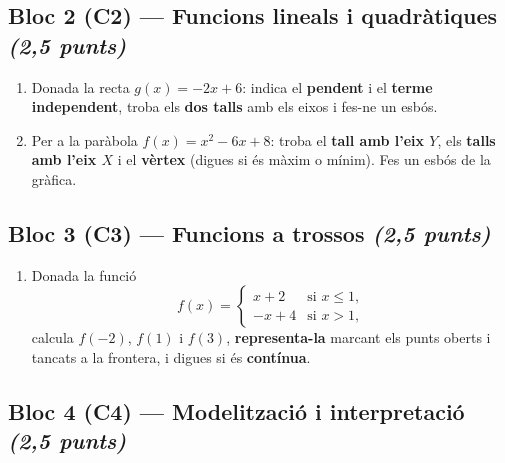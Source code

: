 \subsection*{Bloc 2 (C2) — Funcions lineals i quadràtiques \hfill \normalfont\itshape (2,5 punts)}

\begin{enumerate}[label=\textbf{\arabic*.}, leftmargin=2em, itemsep=8pt, start=3]
  \item Donada la recta $g(x)=-2x+6$: indica el \textbf{pendent} i el \textbf{terme
        independent}, troba els \textbf{dos talls} amb els eixos i fes-ne un esbós.
  \item Per a la paràbola $f(x)=x^2-6x+8$: troba el \textbf{tall amb l'eix $Y$}, els
        \textbf{talls amb l'eix $X$} i el \textbf{vèrtex} (digues si és màxim o mínim).
        Fes un esbós de la gràfica.
\end{enumerate}

\subsection*{Bloc 3 (C3) — Funcions a trossos \hfill \normalfont\itshape (2,5 punts)}

\begin{enumerate}[label=\textbf{\arabic*.}, leftmargin=2em, itemsep=8pt, start=5]
  \item Donada la funció
    \[
    f(x)=
    \begin{cases}
    x+2 & \text{si } x\le 1,\\[2pt]
    -x+4 & \text{si } x>1,
    \end{cases}
    \]
    calcula $f(-2)$, $f(1)$ i $f(3)$, \textbf{representa-la} marcant els punts oberts
    i tancats a la frontera, i digues si és \textbf{contínua}.
\end{enumerate}

\subsection*{Bloc 4 (C4) — Modelització i interpretació \hfill \normalfont\itshape (2,5 punts)}

